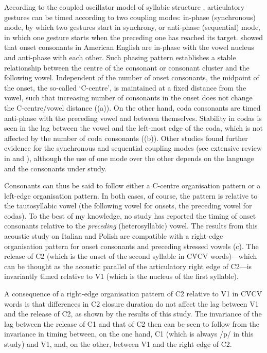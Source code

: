\documentclass[preprint]{JASAnew}
\begin{document}
According to the coupled oscillator model of syllabic structure
\citep{browman1988, browman2000, goldstein2006, goldstein2014},
articulatory gestures can be timed according to two coupling modes:
in-phase (synchronous) mode, by which two gestures start in synchrony,
or anti-phase (sequential) mode, in which one gesture starts when the
preceding one has reached its target. \citet{marin2010} showed that
onset consonants in American English are in-phase with the vowel nucleus
and anti-phase with each other. Such phasing pattern establishes a
stable relationship between the centre of the consonant or consonant
cluster and the following vowel. Independent of the number of onset
consonants, the midpoint of the onset, the so-called `C-centre', is
maintained at a fixed distance from the vowel, such that increasing
number of consonants in the onset does not change the C-centre/vowel
distance ((a)). On the other hand, coda consonants
are timed anti-phase with the preceding vowel and between themselves.
Stability in codas is seen in the lag between the vowel and the
left-most edge of the coda, which is not affected by the number of coda
consonants ((b)). Other studies found further
evidence for the synchronous and sequential coupling modes (see
extensive review in \citet{marin2010} and \citet{marin2014}), although
the use of one mode over the other depends on the language and the
consonants under study.

Consonants can thus be said to follow either a C-centre organisation
pattern or a left-edge organisation pattern. In both cases, of course,
the pattern is relative to the tautosyllabic vowel (the following vowel
for onsets, the preceding vowel for codas). To the best of my knowledge,
no study has reported the timing of onset consonants relative to the
\emph{preceding} (heterosyllabic) vowel. The results from this acoustic
study on Italian and Polish are compatible with a right-edge
organisation pattern for onset consonants and preceding stressed vowels
(c). The release of C2 (which is the onset of the
second syllable in CV́CV words)---which can be thought as the acoustic
parallel of the articulatory right edge of C2---is invariantly timed
relative to V1 (which is the nucleus of the first syllable).

A consequence of a right-edge organisation pattern of C2 relative to V1
in CV́CV words is that differences in C2 closure duration do not affect
the lag between V1 and the release of C2, as shown by the results of
this study. The invariance of the lag between the release of C1 and that
of C2 then can be seen to follow from the invariance in timing between,
on the one hand, C1 (which is always /p/ in this study) and V1, and, on
the other, between V1 and the right edge of C2.
\end{document}

